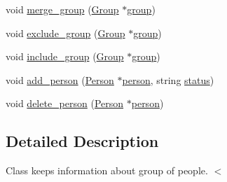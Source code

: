 \begin{DoxyCompactItemize}
\item 
void \hyperlink{classGroup_a2aca17525330aeaf591e0bc243a8149e}{merge\_\-group} (\hyperlink{classGroup}{Group} $\ast$\hyperlink{group__content_8h_a27517aa1480ab2d9bfe5d62e693b33eb}{group})
\item 
void \hyperlink{classGroup_a7fccd60929bd2e36db09fe37fffe0548}{exclude\_\-group} (\hyperlink{classGroup}{Group} $\ast$\hyperlink{group__content_8h_a27517aa1480ab2d9bfe5d62e693b33eb}{group})
\item 
void \hyperlink{classGroup_ac753fa2674ec19ab156645f978654961}{include\_\-group} (\hyperlink{classGroup}{Group} $\ast$\hyperlink{group__content_8h_a27517aa1480ab2d9bfe5d62e693b33eb}{group})
\item 
void \hyperlink{classGroup_afc2080f42e091f6831fd9d80e7b8f0d9}{add\_\-person} (\hyperlink{classPerson}{Person} $\ast$\hyperlink{group__content_8h_ab8664e6fd42f01eeaad084b5e20eb54e}{person}, string \hyperlink{group__content_8h_ab4d38e7365d935f2a5f1403eec29127e}{status})
\item 
void \hyperlink{classGroup_ad00847c4219c29fd3b94c6784870b629}{delete\_\-person} (\hyperlink{classPerson}{Person} $\ast$\hyperlink{group__content_8h_ab8664e6fd42f01eeaad084b5e20eb54e}{person})
\end{DoxyCompactItemize}


\subsection{Detailed Description}
Class keeps information about group of people. $<$ 

